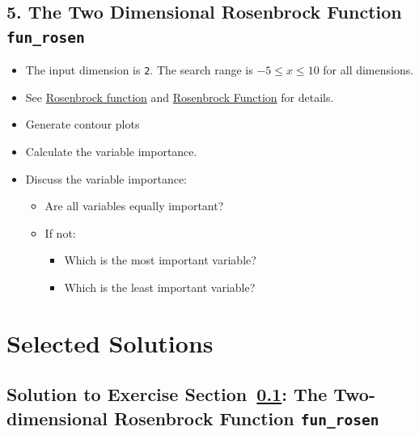 \documentclass[
  letterpaper,
  DIV=11,
  numbers=noendperiod]{scrreprt}
\providecommand{\tightlist}{%
  \setlength{\itemsep}{0pt}\setlength{\parskip}{0pt}}\usepackage{longtable,booktabs,array}
\begin{document}
\subsection{\texorpdfstring{5. The Two Dimensional Rosenbrock Function
\texttt{fun\_rosen}}{5. The Two Dimensional Rosenbrock Function fun\_rosen}}\label{sec-08-exer-rosenbrock}

\begin{itemize}
\tightlist
\item
  The input dimension is \texttt{2}. The search range is
  \(-5 \leq x \leq 10\) for all dimensions.
\item
  See
  \href{https://en.wikipedia.org/wiki/Rosenbrock_function}{Rosenbrock
  function} and
  \href{https://www.sfu.ca/~ssurjano/rosen.html}{Rosenbrock Function}
  for details.
\item
  Generate contour plots
\item
  Calculate the variable importance.
\item
  Discuss the variable importance:

  \begin{itemize}
  \tightlist
  \item
    Are all variables equally important?
  \item
    If not:

    \begin{itemize}
    \tightlist
    \item
      Which is the most important variable?
    \item
      Which is the least important variable?
    \end{itemize}
  \end{itemize}
\end{itemize}

\section{Selected Solutions}\label{selected-solutions}

\subsection{\texorpdfstring{Solution to Exercise
Section~\ref{sec-08-exer-rosenbrock}: The Two-dimensional Rosenbrock
Function
\texttt{fun\_rosen}}{Solution to Exercise Section~: The Two-dimensional Rosenbrock Function fun\_rosen}}\label{solution-to-exercise-sec-08-exer-rosenbrock-the-two-dimensional-rosenbrock-function-fun_rosen}
\end{document}
